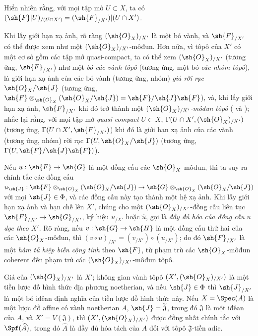 \documentclass[oneside]{amsart}
\makeatletter
\newcommand{\ega@arrow}[2]{\mathchoice{#1}{#2}{#2}{#2}}
\renewcommand{\to}{\ega@arrow{\longrightarrow}{\rightarrow}}
\let\EGAOriginalLabel\label
\renewcommand{\label}[1]{\phantomsection\EGAOriginalLabel{#1}}
\makeatother
\begin{document}
Hiển nhiên rằng, với mọi tập mở $U\subset X$, ta có $(\sh{F}|U)_{/(U\cap X')}=(\sh{F}_{/X'})|(U\cap X')$.

Khi lấy giới hạn xạ ảnh, rõ ràng $(\sh{O}_X)_{/X'}$ là một bó vành, và $\sh{F}_{/X'}$ có thể được xem như một $(\sh{O}_X)_{/X'}$-môđun.
Hơn nữa, vì tôpô của $X'$ có một cơ sở gồm các tập mở quasi-compact, ta có thể xem $(\sh{O}_X)_{/X'}$ (tương ứng, $\sh{F}_{/X'}$) như một \emph{bó các vành tôpô} (tương ứng, một bó \emph{các nhóm tôpô}), là giới hạn xạ ảnh của các bó vành (tương ứng, nhóm) \emph{giả rời rạc} $\sh{O}_X/\sh{J}$ (tương ứng, $\sh{F}\otimes_{\sh{O}_X}(\sh{O}_X/\sh{J})=\sh{F}/\sh{J}\sh{F}$), và, khi lấy giới hạn xạ ảnh, $\sh{F}_{/X'}$ khi đó trở thành một \emph{$(\sh{O}_X)_{/X'}$-môđun tôpô} ( và ); nhắc lại rằng, với mọi tập mở \emph{quasi-compact} $U\subset X$, $\Gamma(U\cap X',(\sh{O}_X)_{/X'})$ (tương ứng, $\Gamma(U\cap X',\sh{F}_{/X'})$) khi đó là giới hạn xạ ảnh của các vành (tương ứng, nhóm) rời rạc $\Gamma(U,\sh{O}_X/\sh{J})$ (tương ứng, $\Gamma(U,\sh{F}/\sh{J}\sh{F})$).

Nếu $u:\sh{F}\to\sh{G}$ là một đồng cấu các $\sh{O}_X$-môđun, thì ta suy ra chính tắc các đồng cấu $u_\sh{J}:\sh{F}\otimes_{\sh{O}_X}(\sh{O}_X/\sh{J})\to\sh{G}\otimes_{\sh{O}_X}(\sh{O}_X/\sh{J})$ với mọi $\sh{J}\in\Phi$, và các đồng cấu này tạo thành một hệ xạ ảnh.
Khi lấy giới hạn xạ ảnh và hạn chế lên $X'$, chúng cho một $(\sh{O}_X)_{/X'}$-đồng cấu liên tục $\sh{F}_{/X'}\to\sh{G}_{/X'}$, ký hiệu $u_{/X'}$ hoặc $\widehat{u}$, gọi là \emph{đầy đủ hóa của đồng cấu $u$ dọc theo $X'$}.
Rõ ràng, nếu $v:\sh{G}\to\sh{H}$ là một đồng cấu thứ hai của các $\sh{O}_X$-môđun, thì $(v\circ u)_{/X'}=(v_{/X'})\circ(u_{/X'})$; do đó $\sh{F}_{/X'}$ là một \emph{hàm tử hiệp biến cộng tính} theo $\sh{F}$, từ phạm trù các $\sh{O}_X$-môđun coherent đến phạm trù các $(\sh{O}_X)_{/X'}$-môđun tôpô.

\begin{proposition}[10.8.5]
\label{I.10.8.5}
Giá của $(\sh{O}_X)_{/X'}$ là $X'$; không gian vành tôpô $(X',(\sh{O}_X)_{/X'})$ là một tiền lược đồ hình thức địa phương noetherian, và nếu $\sh{J}\in\Phi$ thì $\sh{J}_{/X'}$ là một bó iđêan định nghĩa của tiền lược đồ hình thức này.
Nếu $X=\Spec(A)$ là một lược đồ affine có vành noetherian $A$, $\sh{J}=\widetilde{\mathfrak{J}}$, trong đó $\mathfrak{J}$ là một iđêan của $A$, và $X'=V(\mathfrak{J})$, thì $(X',(\sh{O}_X)_{/X'})$ được đồng nhất chính tắc với $\Spf(\widehat{A})$, trong đó $\widehat{A}$ là đầy đủ hóa tách của $A$ đối với tôpô $\mathfrak{J}$-tiền adic.
\end{proposition}
\end{document}
